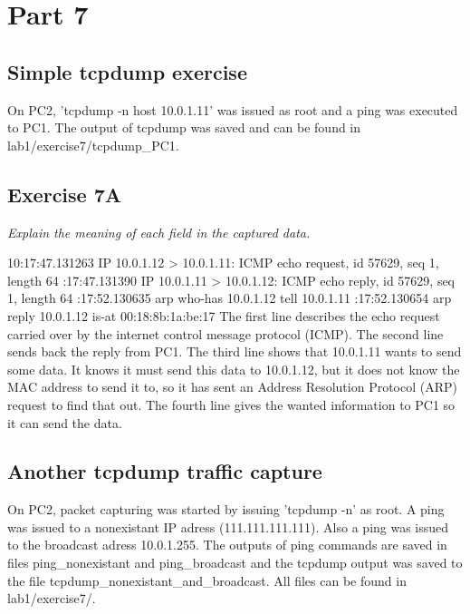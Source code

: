 \documentclass[a4paper, 11pt]{article}
\begin{document}
\section{Part 7}

\subsection{Simple tcpdump exercise}

On PC2, 'tcpdump -n host 10.0.1.11' was issued as root and a ping was executed to PC1. The output of tcpdump was saved and can
be found in lab1/exercise7/tcpdump_PC1.

\subsection{Exercise 7A}

\emph{ Explain the meaning of each field in the captured data.}

10:17:47.131263 IP 10.0.1.12 > 10.0.1.11: ICMP echo request, id 57629, seq 1, length 64 :17:47.131390 IP 10.0.1.11 > 10.0.1.12: ICMP echo reply, id 57629, seq 1, length 64 :17:52.130635 arp who-has 10.0.1.12 tell 10.0.1.11 :17:52.130654 arp reply 10.0.1.12 is-at 00:18:8b:1a:be:17 \newline
\newline
The first line describes the echo request carried over by the internet control message protocol (ICMP). \newline
The second line sends back the reply from PC1. \newline
The third line shows that 10.0.1.11 wants to send some data. It knows it must send this data to 10.0.1.12, but it does not know
the MAC address to send it to, so it has sent an Address Resolution Protocol (ARP) request to find that out. \newline
The fourth line gives the wanted information to PC1 so it can send the data.

\subsection {Another tcpdump traffic capture}

On PC2, packet capturing was started by issuing 'tcpdump -n' as root. A ping was issued to a nonexistant IP adress (111.111.111.111).
Also a ping was issued to the broadcast adress 10.0.1.255. The outputs of ping commands are saved in files ping_nonexistant and ping_broadcast 
and the tcpdump output was saved to the file tcpdump_nonexistant_and_broadcast. All files can be found in lab1/exercise7/.
\end{document}

